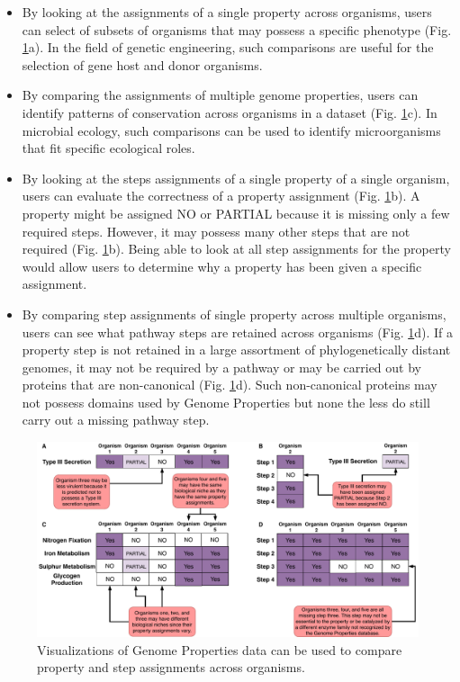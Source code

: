\begin{itemize}
\item By looking at the assignments of a single property across organisms, users can select of subsets of organisms that may possess a specific phenotype (Fig. \ref{fig:client-analysis-types}a). In the field of genetic engineering, such comparisons are useful for the selection of gene host and donor organisms.
\item By comparing the assignments of multiple genome properties, users can identify patterns of conservation across organisms in a dataset (Fig. \ref{fig:client-analysis-types}c). In microbial ecology, such comparisons can be used to identify microorganisms that fit specific ecological roles.
\item By looking at the steps assignments of a single property of a single organism, users can evaluate the correctness of a property assignment (Fig. \ref{fig:client-analysis-types}b). A property might be assigned NO or PARTIAL because it is missing only a few required steps. However, it may possess many other steps that are not required (Fig. \ref{fig:client-analysis-types}b). Being able to look at all step assignments for the property would allow users to determine why a property has been given a specific assignment.
\item By comparing step assignments of single property across multiple organisms, users can see what pathway steps are retained across organisms (Fig. \ref{fig:client-analysis-types}d). If a property step is not retained in a large assortment of phylogenetically distant genomes, it may not be required by a pathway or may be carried out by proteins that are non-canonical (Fig. \ref{fig:client-analysis-types}d). Such non-canonical proteins may not possess domains used by Genome Properties but none the less do still carry out a missing pathway step.
\end{itemize}

\begin{figure}[!ht]
  \centering
	\includegraphics[width=\textwidth]{media/analysis_types.pdf}
	 \caption{Visualizations of Genome Properties data can be used to compare property and step assignments across organisms.}
	 \label{fig:client-analysis-types}
\end{figure}

